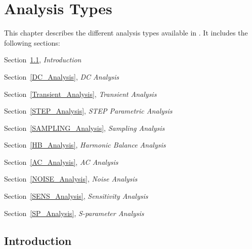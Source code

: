 


\chapter{Analysis Types}
\label{Analysis_Chap}

{
This chapter describes the different analysis types
available in \Xyce{}.  It includes the following sections:
\begin{XyceItemize}
\item Section~\ref{analysis_intro},     {\em Introduction}
\item Section~\ref{DC_Analysis},        {\em DC Analysis}
\item Section~\ref{Transient_Analysis}, {\em Transient Analysis}
\item Section~\ref{STEP_Analysis},      {\em STEP Parametric Analysis}
\item Section~\ref{SAMPLING_Analysis},  {\em Sampling Analysis}
\item Section~\ref{HB_Analysis},        {\em Harmonic Balance Analysis}
\item Section~\ref{AC_Analysis},        {\em AC Analysis}
\item Section~\ref{NOISE_Analysis},     {\em Noise Analysis}
\item Section~\ref{SENS_Analysis},      {\em Sensitivity Analysis}
\item Section~\ref{SP_Analysis},        {\em S-parameter Analysis}
\end{XyceItemize}
}

\section{Introduction}
\label{analysis_intro}


